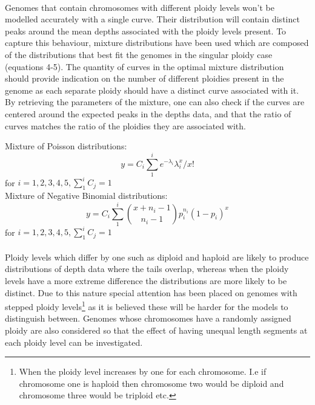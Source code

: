 \documentclass[11pt]{article}
\begin{document}
\paragraph{}Genomes that contain chromosomes with different ploidy levels won't be modelled accurately with a single curve. Their distribution will contain distinct peaks around the mean depths associated with the ploidy levels present. To capture this behaviour, mixture distributions have been used which are composed of the distributions that best fit the genomes in the singular ploidy case (equations 4-5). The quantity of curves in the optimal mixture distribution should provide indication on the number of different ploidies present in the genome as each separate ploidy should have a distinct curve associated with it. By retrieving the parameters of the mixture, one can also check if the curves are centered around the expected peaks in the depths data, and that the ratio of curves matches the ratio of the ploidies they are associated with.
\begin{center}
Mixture of Poisson distributions: 
\begin{equation}
y=C_{i}\sum_{1}^{i}e^{-\lambda_{i}}\lambda_{i}^{x}/x!
\end{equation}
for $i= 1,2,3,4,5 , \sum_{1}^{i}C_{j}=1 $
\\
\smallskip
Mixture of Negative Binomial distributions: 
\begin{equation}
y=C_{i}\sum_{1}^{i}\binom{x+n_{i}-1}{n_{i}-1}p_{i}^{n_{i}}(1-p_{i})^{x}
\end{equation}
for $i= 1,2,3,4,5 , \sum_{1}^{i}C_{j}=1$
\end{center} 
\paragraph{}Ploidy levels which differ by one such as diploid and haploid are likely to produce distributions of depth data where the tails overlap, whereas when the ploidy levels have a more extreme difference the distributions are more likely to be distinct. Due to this nature special attention has been placed on genomes with stepped ploidy levels\footnote{When the ploidy level increases by one for each chromosome. I.e if chromosome one is haploid then chromosome two would be diploid and chromosome three would be triploid etc.} as it is believed these will be harder for the models to distinguish between. Genomes whose chromosomes have a randomly assigned ploidy are also considered so that the effect of having unequal length segments at each ploidy level can be investigated.
\end{document}
